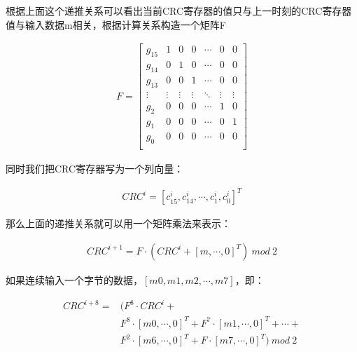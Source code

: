 \documentclass[
]{article}
\begin{document}
根据上面这个递推关系可以看出当前CRC寄存器的值只与上一时刻的CRC寄存器值与输入数据m相关，根据计算关系构造一个矩阵F

\begin{equation}
\begin{aligned}
F = 
\left[
\begin{matrix}
 g_{15}      & 1      & 0      & 0      & \cdots & 0      & 0      \\
 g_{14}      & 0      & 1      & 0      & \cdots & 0      & 0      \\
 g_{13}      & 0      & 0      & 1      & \cdots & 0      & 0      \\
 \vdots      & \vdots & \vdots & \vdots & \ddots & \vdots & \vdots\\
 g_{2}      & 0      & 0      & 0      & \cdots & 1      & 0      \\
 g_{1}      & 0      & 0      & 0      & \cdots & 0      & 1      \\
 g_{0}      & 0      & 0      & 0      & \cdots & 0      & 0      \\
\end{matrix}
\right]
\end{aligned}
\end{equation}

同时我们把CRC寄存器写为一个列向量：

\begin{equation}
\begin{aligned}
CRC^i = [c_{15}^i,c_{14}^i,\cdots,c_1^i,c_0^i]^T
\end{aligned}
\end{equation}

那么上面的递推关系就可以用一个矩阵乘法来表示：

\begin{equation}
\begin{aligned}
CRC^{i+1} = F \cdot (CRC^{i} + [m,\cdots,0]^T) \: mod \: 2
\end{aligned}
\end{equation}

如果连续输入一个字节的数据，$[m0, m1, m2, \cdots, m7]$，即：

\begin{equation}
\begin{aligned}
CRC^{i+8} = &(F^8 \cdot CRC^{i} + \\
&F^8 \cdot [m0,\cdots,0]^T + F^7 \cdot [m1,\cdots,0]^T + \cdots + \\
&F^2 \cdot [m6,\cdots,0]^T + F \cdot [m7,\cdots,0]^T) \: mod \: 2
\end{aligned}
\end{equation}
\end{document}
